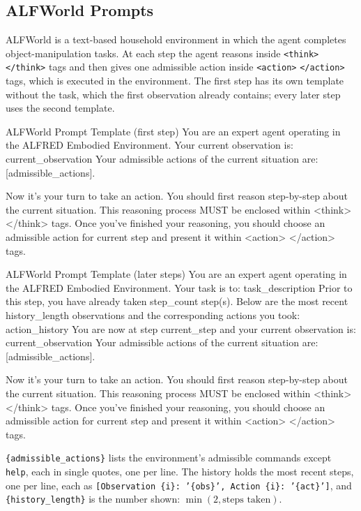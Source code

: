 \subsection{ALFWorld Prompts}
\label{app:prompt-alfworld}

ALFWorld is a text-based household environment in which the agent completes object-manipulation
tasks. At each step the agent reasons inside \texttt{<think>} \texttt{</think>} tags and then gives one
admissible action inside \texttt{<action>} \texttt{</action>} tags, which is executed in the
environment. The first step has its own template without the task, which the first observation
already contains; every later step uses the second template.

\begin{promptbox}{ALFWorld Prompt Template (first step)}
You are an expert agent operating in the ALFRED Embodied Environment.
Your current observation is: {current_observation}
Your admissible actions of the current situation are: [{admissible_actions}].

Now it's your turn to take an action.
You should first reason step-by-step about the current situation. This reasoning process MUST be enclosed within <think> </think> tags.
Once you've finished your reasoning, you should choose an admissible action for current step and present it within <action> </action> tags.
\end{promptbox}

\begin{promptbox}{ALFWorld Prompt Template (later steps)}
You are an expert agent operating in the ALFRED Embodied Environment. Your task is to: {task_description}
Prior to this step, you have already taken {step_count} step(s). Below are the most recent {history_length} observations and the corresponding actions you took: {action_history}
You are now at step {current_step} and your current observation is: {current_observation}
Your admissible actions of the current situation are: [{admissible_actions}].

Now it's your turn to take an action.
You should first reason step-by-step about the current situation. This reasoning process MUST be enclosed within <think> </think> tags.
Once you've finished your reasoning, you should choose an admissible action for current step and present it within <action> </action> tags.
\end{promptbox}

\noindent \texttt{\{admissible\_actions\}} lists the environment's admissible commands except
\texttt{help}, each in single quotes, one per line. The history holds the most recent steps, one per
line, each as \texttt{[Observation \{i\}: '\{obs\}', Action \{i\}: '\{act\}']}, and
\texttt{\{history\_length\}} is the number shown: $\min(2, \text{steps taken})$.

